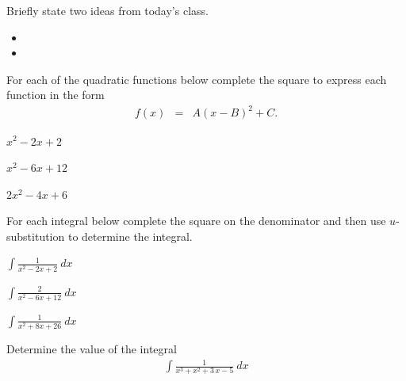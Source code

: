 \postClass

\begin{problem}
\item Briefly state two ideas from today's class.
  \begin{itemize}
  \item
  \item
  \end{itemize}
\item
  \begin{subproblem}
    \item
  \end{subproblem}
\end{problem}



\begin{problem}
\item For each of the quadratic functions below complete the square to
  express each function in the form
  \begin{eqnarray*}
    f(x) & = & A(x-B)^2 + C.
  \end{eqnarray*}
  \begin{subproblem}
  \item $x^2 - 2x + 2$
    \vfill
  \item $x^2 - 6x + 12$
    \vfill
  \item $2x^2 - 4x + 6$
    \vfill
  \end{subproblem}
\end{problem}

\begin{problem}
\item For each integral below complete the square on the denominator
  and then use $u$-substitution to determine the integral.
  \begin{subproblem}
    \item ${\displaystyle \int}\frac{1}{x^2 - 2x + 2}~dx$ \\
      \vfill
    \item ${\displaystyle\int}\frac{2}{x^2 - 6x + 12}~dx$ \\
      \vfill
    \item ${\displaystyle\int}\frac{1}{x^2 + 8x + 26}~dx$ \\
      \vfill
  \end{subproblem}

  \clearpage

\item Determine the value of the integral
  \begin{eqnarray*}
    \int \frac{1}{x^3+x^2+3\,x-5} ~ dx
  \end{eqnarray*}

  \vfill

\end{problem}


